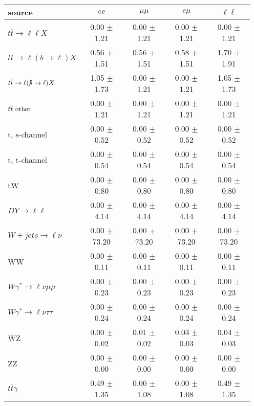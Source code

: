 \begin{tabular}{l|cccc} \hline\hline
source & $ee$ & $\mu\mu$ & $e\mu$ & $\ell\ell $ \\
\hline
$t\overline{t} \rightarrow \ell \ell X$ &  0.00 $\pm$  1.21 &  0.00 $\pm$  1.21 &  0.00 $\pm$  1.21 &  0.00 $\pm$  1.21 \\
$t\overline{t} \rightarrow \ell (b \rightarrow \ell) X$ &  0.56 $\pm$  1.51 &  0.56 $\pm$  1.51 &  0.58 $\pm$  1.51 &  1.70 $\pm$  1.91 \\
$t\overline{t} \rightarrow \ell (\slashed b \rightarrow \ell) X$ &  1.05 $\pm$  1.73 &  0.00 $\pm$  1.21 &  0.00 $\pm$  1.21 &  1.05 $\pm$  1.73 \\
        $t\overline{t}\ \rm{other}$ &  0.00 $\pm$  1.21 &  0.00 $\pm$  1.21 &  0.00 $\pm$  1.21 &  0.00 $\pm$  1.21 \\
\hline
                       t, s-channel &  0.00 $\pm$  0.52 &  0.00 $\pm$  0.52 &  0.00 $\pm$  0.52 &  0.00 $\pm$  0.52 \\
                       t, t-channel &  0.00 $\pm$  0.54 &  0.00 $\pm$  0.54 &  0.00 $\pm$  0.54 &  0.00 $\pm$  0.54 \\
                                 tW &  0.00 $\pm$  0.80 &  0.00 $\pm$  0.80 &  0.00 $\pm$  0.80 &  0.00 $\pm$  0.80 \\
\hline
         $DY \rightarrow \ell \ell$ &  0.00 $\pm$  4.14 &  0.00 $\pm$  4.14 &  0.00 $\pm$  4.14 &  0.00 $\pm$  4.14 \\
      $W+jets \rightarrow \ell \nu$ &  0.00 $\pm$ 73.20 &  0.00 $\pm$ 73.20 &  0.00 $\pm$ 73.20 &  0.00 $\pm$ 73.20 \\
                                 WW &  0.00 $\pm$  0.11 &  0.00 $\pm$  0.11 &  0.00 $\pm$  0.11 &  0.00 $\pm$  0.11 \\
\hline
$W\gamma^{*} \rightarrow \ell \nu \mu\mu$ &  0.00 $\pm$  0.23 &  0.00 $\pm$  0.23 &  0.00 $\pm$  0.23 &  0.00 $\pm$  0.23 \\
$W\gamma^{*} \rightarrow \ell \nu \tau\tau$ &  0.00 $\pm$  0.24 &  0.00 $\pm$  0.24 &  0.00 $\pm$  0.24 &  0.00 $\pm$  0.24 \\
                                 WZ &  0.00 $\pm$  0.02 &  0.01 $\pm$  0.02 &  0.03 $\pm$  0.03 &  0.04 $\pm$  0.03 \\
                                 ZZ &  0.00 $\pm$  0.00 &  0.00 $\pm$  0.00 &  0.00 $\pm$  0.00 &  0.00 $\pm$  0.00 \\
\hline
              $t\overline{t}\gamma$ &  0.49 $\pm$  1.35 &  0.00 $\pm$  1.08 &  0.00 $\pm$  1.08 &  0.49 $\pm$  1.35 \\

\end{tabular}
